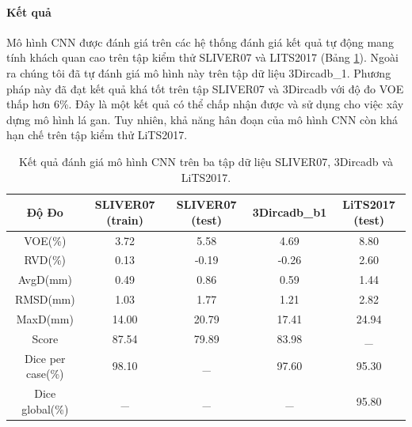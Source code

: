 \paragraph{Kết quả}
Mô hình CNN được đánh giá trên các hệ thống đánh giá kết quả tự động mang tính khách quan cao trên tập kiểm thử SLIVER07 và LITS2017 (Bảng \ref{tab:CNN-SLIVER07_Test}). Ngoài ra chúng tôi đã tự đánh giá mô hình này trên tập dữ liệu 3Dircadb\_1. Phương pháp này đã đạt kết quả khá tốt trên tập SLIVER07 và 3Dircadb với độ đo VOE thấp hơn 6\%. Đây là một kết quả có thể chấp nhận được và sử dụng cho việc xây dựng mô hình lá gan. Tuy nhiên, khả năng hân đoạn của mô hình CNN còn khá hạn chế trên tập kiểm thử LiTS2017.
\begin{table}[]
\begin{tabular}{|c|c|c|c|c|}
\hline
\textbf{Độ Đo} & \textbf{SLIVER07 (train)} & \textbf{SLIVER07 (test)} & \textbf{3Dircadb\_b1} & \textbf{LiTS2017 (test)} \\ \hline
VOE(\%)            & 3.72                      & 5.58                     & 4.69                  & 8.80                     \\ \hline
RVD(\%)            & 0.13                      & -0.19                    & -0.26                 & 2.60                     \\ \hline
AvgD(mm)           & 0.49                      & 0.86                     & 0.59                  & 1.44                     \\ \hline
RMSD(mm)           & 1.03                      & 1.77                     & 1.21                  & 2.82                     \\ \hline
MaxD(mm)           & 14.00                     & 20.79                    & 17.41                 & 24.94                    \\ \hline
Score          & 87.54                     & 79.89                    & 83.98                 & \_                       \\ \hline
Dice per case(\%)  & 98.10                     & \_                       & 97.60                 & 95.30                     \\ \hline
Dice global(\%)    & \_                        & \_                       & \_                    & 95.80                     \\ \hline
\end{tabular}
\caption{\label{tab:CNN-SLIVER07_Test}Kết quả đánh giá mô hình CNN trên ba tập dữ liệu SLIVER07, 3Dircadb và LiTS2017.}
\end{table}
